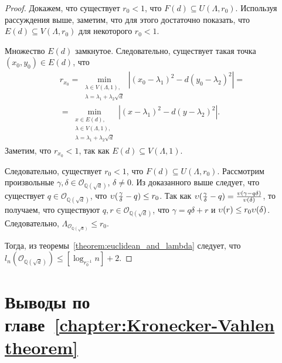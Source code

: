 \documentclass[_00_dissertation.tex]{subfiles}
\begin{document}
\begin{proof}
    Докажем, что существует $r_0 < 1$, что $F(d) \subseteq U(\Lambda, r_0)$.
    Используя рассуждения выше, заметим, что для этого достаточно показать, что $E(d) \subseteq V(\Lambda, r_0)$ для некоторого $r_0 < 1$.
    
    Множество $E(d)$ замкнутое.
    Следовательно, существует такая точка $(x_0, y_0) \in E(d)$, что
    \begin{equation*}
        \begin{split}
        r_{x_0} = \min_{\substack{
            \lambda \in V(\Lambda, 1),\\
            \lambda = \lambda_1 + \lambda_2 \sqrt{d}
        }} \left|
            (x_0 - \lambda_1)^2 - d(y_0 - \lambda_2)^2
        \right| =\\
        = \min_{\substack{
            x \in E(d),\\
            \lambda \in V(\Lambda, 1),\\
            \lambda = \lambda_1 + \lambda_2 \sqrt{d}
        }} \left|
            (x - \lambda_1)^2 - d(y - \lambda_2)^2
        \right|.
        \end{split}
    \end{equation*}
    Заметим, что $r_{x_0} < 1$, так как $E(d) \subseteq V(\Lambda, 1)$.

    Следовательно, существует $r_0 < 1$, что $F(d) \subseteq U(\Lambda, r_0)$.
    Рассмотрим произвольные $\gamma, \delta \in \mathcal{O}_{\mathbb{Q}(\sqrt{d})}$, $\delta \neq 0$.
    Из доказанного выше следует, что существует $q \in \mathcal{O}_{\mathbb{Q}(\sqrt{d})}$, что $\upsilon(\frac{\gamma}{\delta} - q) \le r_0$.
    Так как $\upsilon(\frac{\gamma}{\delta} - q) = \frac{\upsilon(\gamma - q\delta)}{\upsilon(\delta)}$, то получаем, что существуют $q, r \in \mathcal{O}_{\mathbb{Q}(\sqrt{d})}$, что $\gamma = q\delta + r$ и $\upsilon(r) \le r_0 \upsilon(\delta)$.
    Следовательно, $\Lambda_{\mathcal{O}_{\mathbb{Q}(\sqrt{d})}} \le r_0$.

    Тогда, из теоремы~\ref{theorem:euclidean_and_lambda} следует, что $l_n(\mathcal{O}_{\mathbb{Q}(\sqrt{d})}) \le [\log_{r_0^{-1}} n] + 2$.
\end{proof}

\section*{Выводы по главе~\ref{chapter:Kronecker-Vahlen theorem}}
\end{document}
